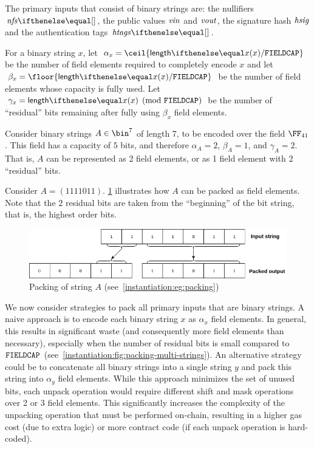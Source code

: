 The primary inputs that consist of binary strings are: the nullifiers $\nfs{}$, the public values $\mathit{vin}$ and $\mathit{vout}$, the signature hash $\mathit{hsig}$ and the authentication tags $\htags{}$.

For a binary string $x$, let $\alpha_x = \ceil{\len{x} / \fieldBitCap}$ be the number of field elements required to completely encode $x$ and let $\beta_x = \floor{\len{x} / \fieldBitCap}$ be the number of field elements whose capacity is fully used. Let $\gamma_x = \len{x} \pmod{\fieldBitCap}$ be the number of ``residual'' bits remaining after fully using $\beta_x$ field elements.

\begin{example}\label{instantiation:eg:packing}
    Consider binary strings $A \in \bin^7$ of length 7, to be encoded over the field $\FFx{41}$. This field has a capacity of $5$ bits, and therefore $\alpha_A = 2$, $\beta_A = 1$, and $\gamma_A = 2$. That is, $A$ can be represented as 2 field elements, or as 1 field element with 2 ``residual'' bits.

    Consider $A = (1111011)$. \cref{instantiation:fig:packingA} illustrates how $A$ can be packed as field elements. Note that the 2 residual bits are taken from the ``beginning'' of the bit string, that is, the highest order bits.
\end{example}

\begin{figure}[ht]
    \centering
    \includegraphics[width=1\textwidth]{images/bit-packing-stringA.png}
    \caption{Packing of string $A$ (see~\cref{instantiation:eg:packing})}\label{instantiation:fig:packingA}
\end{figure}

We now consider strategies to pack all primary inputs that are binary strings. A naive approach is to encode each binary string $x$ as $\alpha_x$ field elements. In general, this results in significant waste (and consequently more field elements than necessary), especially when the number of residual bits is small compared to $\mathtt{FIELDCAP}$ (see~\cref{instantiation:fig:packing-multi-strings}). An alternative strategy could be to concatenate all binary strings into a single string $y$ and pack this string into $\alpha_y$ field elements. While this approach minimizes the set of unused bits, each unpack operation would require different shift and mask operations over 2 or 3 field elements. This significantly increases the complexity of the unpacking operation that must be performed on-chain, resulting in a higher gas cost (due to extra logic) or more contract code (if each unpack operation is hard-coded).

